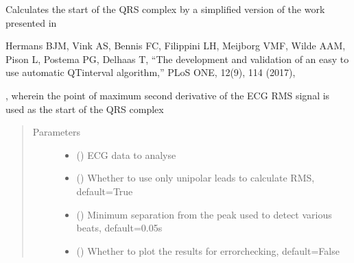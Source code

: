 \documentclass[letterpaper,10pt,english]{sphinxmanual}
\begin{document}
\begin{fulllineitems}
\begin{fulllineitems}
\sphinxAtStartPar
Calculates the start of the QRS complex by a simplified version of the work presented in \sphinxstepexplicit %
\begin{footnote}[1]\label{\thesphinxscope.1}%
\sphinxAtStartFootnote
Hermans BJM, Vink AS, Bennis FC, Filippini LH, Meijborg VMF, Wilde AAM, Pison L, Postema PG, Delhaas T,
“The development and validation of an easy to use automatic QT\sphinxhyphen{}interval algorithm,”
PLoS ONE, 12(9), 1\textendash{}14 (2017), 
%
\end{footnote}, wherein the
point of maximum second derivative of the ECG RMS signal is used as the start of the QRS complex
\begin{quote}\begin{description}
\item[{Parameters}] \leavevmode\begin{itemize}
\item {} 
\sphinxAtStartPar
{} ({\hyperref[\detokenize{_autosummary/signalanalysis.ecg.Ecg:signalanalysis.ecg.Ecg}]{}}) \textendash{} ECG data to analyse

\item {} 
\sphinxAtStartPar
{} (\sphinxstyleliteralemphasis{\sphinxupquote{, }}) \textendash{} Whether to use only unipolar leads to calculate RMS, default=True

\item {} 
\sphinxAtStartPar
{} (\sphinxstyleliteralemphasis{\sphinxupquote{, }}) \textendash{} Minimum separation from the peak used to detect various beats, default=0.05s

\item {} 
\sphinxAtStartPar
{} (\sphinxstyleliteralemphasis{\sphinxupquote{, }}) \textendash{} Whether to plot the results for error\sphinxhyphen{}checking, default=False

\end{itemize}


\end{description}
\end{quote}
\end{fulllineitems}
\end{fulllineitems}
\end{document}
